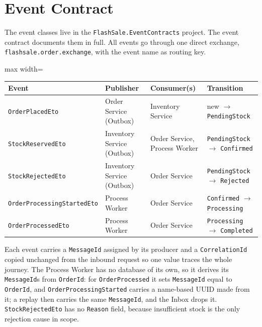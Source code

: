 \documentclass[a4paper]{report}
\begin{document}
\section{Event Contract}
The event classes live in the \texttt{FlashSale.\allowbreak EventContracts}
project. The event contract documents them in full. All events go through one
direct exchange, \texttt{flashsale.\allowbreak order.\allowbreak exchange},
with the event name as routing key.

\begin{center}
\small
\begin{adjustbox}{max width=\linewidth}
\begin{tabular}{@{}>{\raggedright\arraybackslash}p{3.7cm}>{\raggedright\arraybackslash}p{3.1cm}>{\raggedright\arraybackslash}p{3.0cm}>{\raggedright\arraybackslash}p{3.8cm}@{}}
\toprule
Event & Publisher & Consumer(s) & Transition \\
\midrule
\texttt{OrderPlacedEto} & Order Service (Outbox) & Inventory Service & new $\to$ \texttt{PendingStock} \\
\texttt{StockReservedEto} & Inventory Service (Outbox) & Order Service, Process Worker & \texttt{PendingStock} $\to$ \texttt{Confirmed} \\
\texttt{StockRejectedEto} & Inventory Service (Outbox) & Order Service & \texttt{PendingStock} $\to$ \texttt{Rejected} \\
\texttt{OrderProcessing\allowbreak StartedEto} & Process Worker & Order Service & \texttt{Confirmed} $\to$ \texttt{Processing} \\
\texttt{OrderProcessedEto} & Process Worker & Order Service & \texttt{Processing} $\to$ \texttt{Completed} \\
\bottomrule
\end{tabular}
\end{adjustbox}
\end{center}

Each event carries a \texttt{MessageId} assigned by its producer and a
\texttt{CorrelationId} copied unchanged from the inbound request so one value
traces the whole journey. The Process Worker has no database of its own, so it derives its \texttt{MessageId}s from \texttt{OrderId}: for \texttt{OrderProcessed} it sets \texttt{MessageId} equal to \texttt{OrderId}, and \texttt{OrderProcessingStarted} carries a name-based UUID made from it; a replay then carries the same \texttt{MessageId}, and the Inbox drops it.
\texttt{StockRejectedEto} has no \texttt{Reason} field, because insufficient
stock is the only rejection cause in scope.
\end{document}
